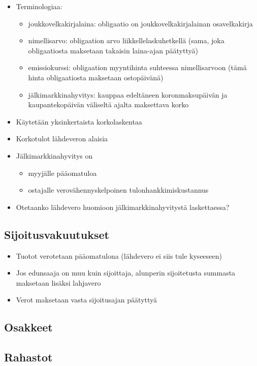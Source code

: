 \documentclass{article}
\begin{document}
\begin{itemize}
\itemsep1pt\parskip0pt
\item
  Terminologiaa:

  \begin{itemize}
    \itemsep1pt\parskip0pt
    \item
      joukkovelkakirjalaina: obligaatio on joukkovelkakirjalainan
      osavelkakirja
    \item
      nimellisarvo: obligaation arvo liikkellelaskuhetkellä (sama, joka
      obligaatiosta maksetaan takaisin laina-ajan päätyttyä)
    \item
      emissiokurssi: obligaation myyntihinta suhteessa nimellisarvoon
      (tämä hinta obligaatiosta maksetaan ostopäivänä)
    \item
      jälkimarkkinahyvitys: kauppaa edeltäneen koronmaksupäivän ja
      kaupantekopäivän väliseltä ajalta maksettava korko
  \end{itemize}
\item
  Käytetään yksinkertaista korkolaskentaa
\item
  Korkotulot lähdeveron alaisia
\item
  Jälkimarkkinahyvitys on 
  \begin{itemize}
    \item 
      myyjälle pääomatuloa
    \item 
      ostajalle verovähennyskelpoinen tulonhankkimiskustannus
  \end{itemize}
\item
  Otetaanko lähdevero huomioon jälkimarkkinahyvitystä laskettaessa?
\end{itemize}

\subsection{Sijoitusvakuutukset}\label{sijoitusvakuutukset}

\begin{itemize}
\itemsep1pt\parskip0pt
\item
  Tuotot verotetaan pääomatulona (lähdevero ei siis tule kyseeseen)
\item
  Jos edunsaaja on muu kuin sijoittaja, alunperin sijoitetusta summasta
  maksetaan lisäksi lahjavero
\item
  Verot maksetaan vasta sijoitusajan päätyttyä
\end{itemize}

\subsection{Osakkeet}\label{osakkeet}

\subsection{Rahastot}\label{rahastot}
\end{document}
